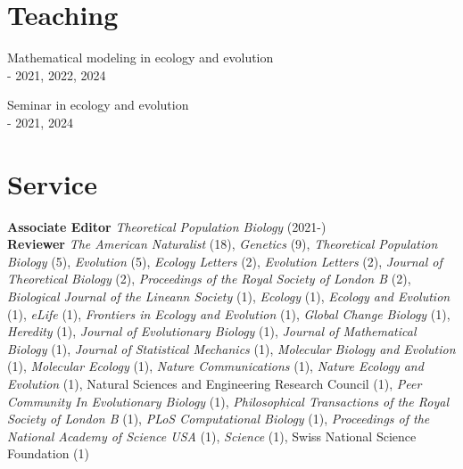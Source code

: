 \documentclass[12pt]{article}
\begin{document}
\section*{Teaching}

\noindent Mathematical modeling in ecology and evolution\\
\indent - 2021, 2022, 2024

\noindent Seminar in ecology and evolution\\
\indent - 2021, 2024

\section*{Service}

\noindent \textbf{Associate Editor} \textit{Theoretical Population Biology} (2021-)\\

\noindent \textbf{Reviewer} \textit{The American Naturalist} (18), \textit{Genetics} (9),  \textit{Theoretical Population Biology} (5), \textit{Evolution} (5), \textit{Ecology Letters} (2), \textit{Evolution Letters} (2), \textit{Journal of Theoretical Biology} (2), \textit{Proceedings of the Royal Society of London B} (2), \textit{Biological Journal of the Lineann Society} (1), \textit{Ecology} (1), \textit{Ecology and Evolution} (1), \textit{eLife} (1), \textit{Frontiers in Ecology and Evolution} (1), \textit{Global Change Biology} (1), \textit{Heredity} (1), \textit{Journal of Evolutionary Biology} (1), \textit{Journal of Mathematical Biology} (1), \textit{Journal of Statistical Mechanics} (1), \textit{Molecular Biology and Evolution} (1), \textit{Molecular Ecology} (1), \textit{Nature Communications} (1), \textit{Nature Ecology and Evolution} (1), Natural Sciences and Engineering Research Council (1), \textit{Peer Community In Evolutionary Biology} (1), \textit{Philosophical Transactions of the Royal Society of London B} (1), \textit{PLoS Computational Biology} (1), \textit{Proceedings of the National Academy of Science USA} (1), \textit{Science} (1), Swiss National Science Foundation (1)


\end{document}
